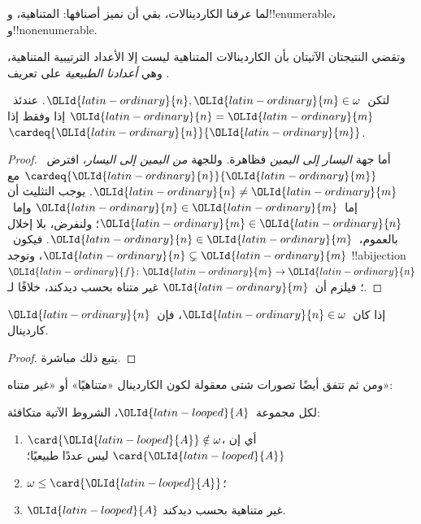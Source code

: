\documentclass[../../../include/open-logic-section]{subfiles}
\begin{document}

لما عرفنا الكاردينالات، بقي أن نميز أصنافها: المتناهية،
و!!{enumerable}، و!!{nonenumerable}.

وتقضي النتيجتان الآتيتان بأن الكاردينالات المتناهية ليست إلا الأعداد
الترتيبية المتناهية، وهي \emph{أعدادنا الطبيعية} على تعريف
.

\begin{prop}
لتكن~$\OLId{latin-ordinary}{n}, \OLId{latin-ordinary}{m} \in \omega$. عندئذ~$\OLId{latin-ordinary}{n} = \OLId{latin-ordinary}{m}$ إذا وفقط إذا
$\cardeq{\OLId{latin-ordinary}{n}}{\OLId{latin-ordinary}{m}}$.
\end{prop}

\begin{proof}
أما جهة \emph{اليسار إلى اليمين} فظاهرة. وللجهة
\emph{من اليمين إلى اليسار}، افترض~$\cardeq{\OLId{latin-ordinary}{n}}{\OLId{latin-ordinary}{m}}$ مع
$\OLId{latin-ordinary}{n} \neq \OLId{latin-ordinary}{m}$. يوجب التثليث أن إما~$\OLId{latin-ordinary}{n} \in \OLId{latin-ordinary}{m}$ وإما~$\OLId{latin-ordinary}{m} \in \OLId{latin-ordinary}{n}$؛ ولنفرض،
بلا إخلال بالعموم،~$\OLId{latin-ordinary}{n} \in \OLId{latin-ordinary}{m}$. فيكون~$\OLId{latin-ordinary}{n} \subsetneq \OLId{latin-ordinary}{m}$، وتوجد
!!a{bijection}~$\OLId{latin-ordinary}{f} \colon \OLId{latin-ordinary}{m} \to \OLId{latin-ordinary}{n}$؛ فيلزم أن~$\OLId{latin-ordinary}{m}$ غير متناه بحسب
ديدكند، خلافًا لـ.
\end{proof}

\begin{cor}
إذا كان~$\OLId{latin-ordinary}{n} \in \omega$، فإن~$\OLId{latin-ordinary}{n}$ كاردينال.
\end{cor}

\begin{proof}
يتبع ذلك مباشرة.
\end{proof}
\noindent
ومن ثم تتفق أيضًا تصورات شتى معقولة لكون الكاردينال «متناهيًا» أو
«غير متناه»:
\begin{thm}لكل مجموعة~$\OLId{latin-looped}{A}$، الشروط الآتية متكافئة:
\begin{enumerate}
	\item{} $\card{\OLId{latin-looped}{A}} \notin \omega$، أي إن
	$\card{\OLId{latin-looped}{A}}$ ليس عددًا طبيعيًا؛
	\item{} $\omega \leq \card{\OLId{latin-looped}{A}}$؛
	\item{} $\OLId{latin-looped}{A}$ غير متناهية بحسب ديدكند.
\end{enumerate}
\end{thm}
\end{document}
